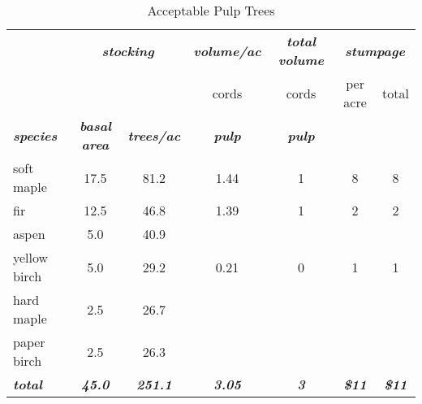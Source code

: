 \documentclass[landscape]{article}
\begin{document}
\begin{table}[H]

\caption{\label{tab:unnamed-chunk-28}Acceptable Pulp Trees}
\fontsize{10}{12}\selectfont
\begin{tabular}[t]{lcccccc}
\toprule
\multicolumn{1}{c}{\em{\textbf{ }}} & \multicolumn{2}{c}{\em{\textbf{stocking}}} & \multicolumn{1}{c}{\em{\textbf{volume/ac }}} & \multicolumn{1}{c}{\em{\textbf{total volume}}} & \multicolumn{2}{c}{\em{\textbf{stumpage}}} \\
\cmidrule(l{3pt}r{3pt}){2-3} \cmidrule(l{3pt}r{3pt}){4-4} \cmidrule(l{3pt}r{3pt}){5-5} \cmidrule(l{3pt}r{3pt}){6-7}
\multicolumn{3}{c}{ } & \multicolumn{1}{c}{cords} & \multicolumn{1}{c}{cords} & \multicolumn{1}{c}{per acre} & \multicolumn{1}{c}{total} \\
\cmidrule(l{3pt}r{3pt}){4-4} \cmidrule(l{3pt}r{3pt}){5-5} \cmidrule(l{3pt}r{3pt}){6-6} \cmidrule(l{3pt}r{3pt}){7-7}
\rowcolor[HTML]{DCDCDC}  \em{\textbf{species}} & \em{\textbf{basal area}} & \em{\textbf{trees/ac}} & \em{\textbf{pulp}} & \em{\textbf{pulp}} & \em{\textbf{ }} & \em{\textbf{ }}\\
\midrule
\rowcolor{gray!6}  soft maple & 17.5 & 81.2 & 1.44 & 1 & 8 & 8\\
 
fir & 12.5 & 46.8 & 1.39 & 1 & 2 & 2\\
 
\rowcolor{gray!6}  aspen & 5.0 & 40.9 &  &  &  & \\
 
yellow birch & 5.0 & 29.2 & 0.21 & 0 & 1 & 1\\
 
\rowcolor{gray!6}  hard maple & 2.5 & 26.7 &  &  &  & \\
 
paper birch & 2.5 & 26.3 &  &  &  & \\
 
\rowcolor{gray!6}  \rowcolor[HTML]{DCDCDC}  \em{\textbf{total}} & \em{\textbf{45.0}} & \em{\textbf{251.1}} & \em{\textbf{3.05}} & \em{\textbf{3}} & \em{\textbf{\$11}} & \em{\textbf{\$11}}\\
\bottomrule
\end{tabular}
\end{table}
\end{document}
